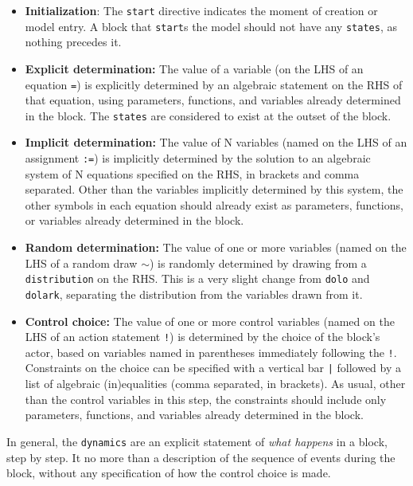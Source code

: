 \documentclass[12pt,pdftex,letterpaper]{article}
\begin{document}
\begin{itemize}
	\item \textbf{Initialization}: The \texttt{start} directive indicates the moment of creation or model entry. A block that \texttt{start}s the model should not have any \texttt{states}, as nothing precedes it.
	
	\item \textbf{Explicit determination:} The value of a variable (on the LHS of an equation \texttt{=}) is explicitly determined by an algebraic statement on the RHS of that equation, using parameters, functions, and variables already determined in the block. The \texttt{states} are considered to exist at the outset of the block.
	
	\item \textbf{Implicit determination:} The value of N variables (named on the LHS of an assignment \texttt{:=}) is implicitly determined by the solution to an algebraic system of N equations specified on the RHS, in brackets and comma separated. Other than the variables implicitly determined by this system, the other symbols in each equation should already exist as parameters, functions, or variables already determined in the block.
	
	\item \textbf{Random determination:} The value of one or more variables (named on the LHS of a random draw \texttt{$\sim$}) is randomly determined by drawing from a \texttt{distribution} on the RHS. This is a very slight change from \texttt{dolo} and \texttt{dolark}, separating the distribution from the variables drawn from it.
	
	\item \textbf{Control choice:} The value of one or more control variables (named on the LHS of an action statement \texttt{!}) is determined by the choice of the block's actor, based on variables named in parentheses immediately following the \texttt{!}. Constraints on the choice can be specified with a vertical bar \texttt{|} followed by a list of algebraic (in)equalities (comma separated, in brackets). As usual, other than the control variables in this step, the constraints should include only parameters, functions, and variables already determined in the block.
\end{itemize}

In general, the \texttt{dynamics} are an explicit statement of \textit{what happens} in a block, step by step. It no more than a description of the sequence of events during the block, without any specification of how the control choice is made.
\end{document}
